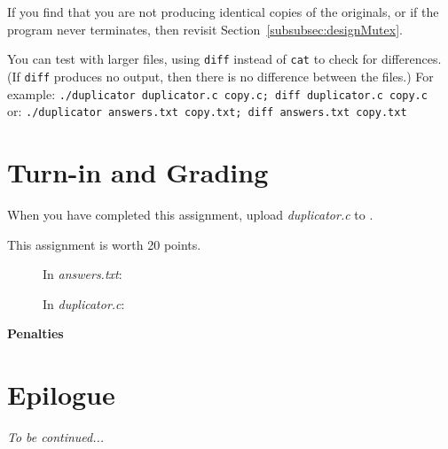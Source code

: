     If you find that you are not producing identical copies of the originals, or if the program never terminates, then revisit Section~\ref{subsubsec:designMutex}.

    You can test with larger files, using \texttt{diff} instead of \texttt{cat} to check for differences.
    (If \texttt{diff} produces no output, then there is no difference between the files.)
    For example: \texttt{./duplicator duplicator.c copy.c; diff duplicator.c copy.c} \\
    or: \texttt{./duplicator answers.txt copy.txt; diff answers.txt copy.txt}


    \section{Turn-in and Grading}

    When you have completed this assignment, upload \textit{duplicator.c} to
    \filesubmission.

    This assignment is worth 20 points. \\

    \begin{description}
        \item[] In \textit{answers.txt}:
        \item[] In \textit{duplicator.c}:
    \end{description}

    \textbf{Penalties}
    \begin{description}
    \end{description}


    \section{Epilogue}

    \WeNeedBetterLocks

    \textit{To be continued...}



